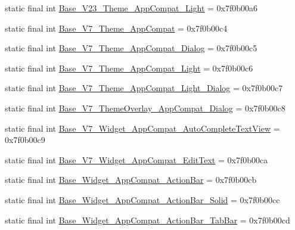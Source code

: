 \begin{CompactItemize}
\item 
static final int \hyperlink{classandroid_1_1support_1_1graphics_1_1drawable_1_1animated_1_1_r_1_1style_c307ec45f468c6cc52e27d286ec809a8}{Base\_\-V23\_\-Theme\_\-AppCompat\_\-Light} = 0x7f0b00a6
\item 
static final int \hyperlink{classandroid_1_1support_1_1graphics_1_1drawable_1_1animated_1_1_r_1_1style_b3ded15ac3831bae92c58f43a5010732}{Base\_\-V7\_\-Theme\_\-AppCompat} = 0x7f0b00c4
\item 
static final int \hyperlink{classandroid_1_1support_1_1graphics_1_1drawable_1_1animated_1_1_r_1_1style_c6a871e4359a9a070bcd56205d3b5b57}{Base\_\-V7\_\-Theme\_\-AppCompat\_\-Dialog} = 0x7f0b00c5
\item 
static final int \hyperlink{classandroid_1_1support_1_1graphics_1_1drawable_1_1animated_1_1_r_1_1style_967843e58d7967f55f6e33d52b6c9a5f}{Base\_\-V7\_\-Theme\_\-AppCompat\_\-Light} = 0x7f0b00c6
\item 
static final int \hyperlink{classandroid_1_1support_1_1graphics_1_1drawable_1_1animated_1_1_r_1_1style_9c07ac1251b3c355adfadfc0af4c586a}{Base\_\-V7\_\-Theme\_\-AppCompat\_\-Light\_\-Dialog} = 0x7f0b00c7
\item 
static final int \hyperlink{classandroid_1_1support_1_1graphics_1_1drawable_1_1animated_1_1_r_1_1style_ff948dd96868a5d84e8ada75a7a8c143}{Base\_\-V7\_\-ThemeOverlay\_\-AppCompat\_\-Dialog} = 0x7f0b00c8
\item 
static final int \hyperlink{classandroid_1_1support_1_1graphics_1_1drawable_1_1animated_1_1_r_1_1style_523a23e4e88b656289cf7b12b2ead60b}{Base\_\-V7\_\-Widget\_\-AppCompat\_\-AutoCompleteTextView} = 0x7f0b00c9
\item 
static final int \hyperlink{classandroid_1_1support_1_1graphics_1_1drawable_1_1animated_1_1_r_1_1style_307321d1d8b20161abfa0cf4b327b022}{Base\_\-V7\_\-Widget\_\-AppCompat\_\-EditText} = 0x7f0b00ca
\item 
static final int \hyperlink{classandroid_1_1support_1_1graphics_1_1drawable_1_1animated_1_1_r_1_1style_e25891c32123b77f2c8c5d04e3a58f17}{Base\_\-Widget\_\-AppCompat\_\-ActionBar} = 0x7f0b00cb
\item 
static final int \hyperlink{classandroid_1_1support_1_1graphics_1_1drawable_1_1animated_1_1_r_1_1style_5a9a495ef76778aa44a7d0b8ca91fa15}{Base\_\-Widget\_\-AppCompat\_\-ActionBar\_\-Solid} = 0x7f0b00cc
\item 
static final int \hyperlink{classandroid_1_1support_1_1graphics_1_1drawable_1_1animated_1_1_r_1_1style_d381a9ccab8cef37ed4eb64f47354529}{Base\_\-Widget\_\-AppCompat\_\-ActionBar\_\-TabBar} = 0x7f0b00cd

\end{CompactItemize}
